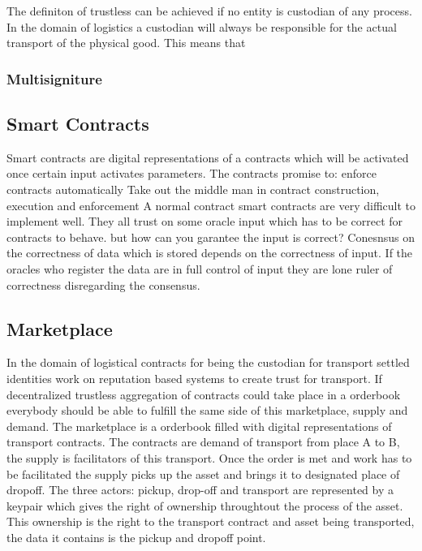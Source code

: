 The definiton of trustless can be achieved if no entity is custodian of any process. In the domain of logistics a custodian will always be responsible for the actual transport of the physical good. This means that

\subsubsection{Multisigniture}



\subsection{Smart Contracts}

Smart contracts are digital representations of a contracts which will be activated once certain input activates parameters. The contracts promise to:
 enforce contracts automatically
Take out the middle man in contract construction, execution and enforcement
A normal contract
smart contracts are very difficult to implement well. They all trust on some oracle input which has to be correct for contracts to behave.  but how can you garantee the input is correct? Conesnsus on the correctness of data which is stored depends on the correctness of input. If the oracles who register the data are in full control of input they are lone ruler of correctness disregarding the consensus.

\subsection{Marketplace}

In the domain of logistical contracts for being the custodian for transport settled identities work on reputation based systems to create trust for transport. If decentralized trustless aggregation of contracts could take place in a orderbook everybody should be able to fulfill the same side of this marketplace, supply and demand.
The marketplace is a orderbook filled with digital representations of transport contracts. The contracts are demand of transport from place A to B, the supply is facilitators of this transport. Once the order is met and work has to be facilitated the supply picks up the asset and brings it to designated place of dropoff. The three actors: pickup, drop-off and transport are represented by a keypair which gives the right of ownership throughtout the process of the asset. This ownership is the right to the transport contract and asset being transported, the data it contains is the pickup and dropoff point.
